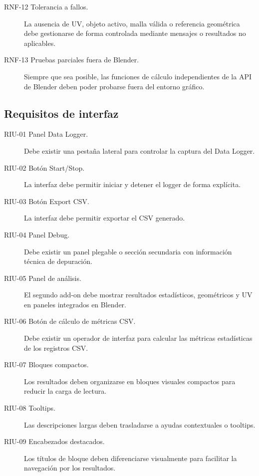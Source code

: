 \begin{description}
    \item[RNF-12 Tolerancia a fallos.] La ausencia de UV, objeto activo, malla válida o referencia geométrica debe gestionarse de forma controlada mediante mensajes o resultados no aplicables.

    \item[RNF-13 Pruebas parciales fuera de Blender.] Siempre que sea posible, las funciones de cálculo independientes de la API de Blender deben poder probarse fuera del entorno gráfico.
\end{description}

\subsection{Requisitos de interfaz}

\begin{description}
    \item[RIU-01 Panel Data Logger.] Debe existir una pestaña lateral para controlar la captura del Data Logger.

    \item[RIU-02 Botón Start/Stop.] La interfaz debe permitir iniciar y detener el logger de forma explícita.

    \item[RIU-03 Botón Export CSV.] La interfaz debe permitir exportar el CSV generado.

    \item[RIU-04 Panel Debug.] Debe existir un panel plegable o sección secundaria con información técnica de depuración.

    \item[RIU-05 Panel de análisis.] El segundo add-on debe mostrar resultados estadísticos, geométricos y UV en paneles integrados en Blender.

    \item[RIU-06 Botón de cálculo de métricas CSV.] Debe existir un operador de interfaz para calcular las métricas estadísticas de los registros CSV.

    \item[RIU-07 Bloques compactos.] Los resultados deben organizarse en bloques visuales compactos para reducir la carga de lectura.

    \item[RIU-08 Tooltips.] Las descripciones largas deben trasladarse a ayudas contextuales o tooltips.

    \item[RIU-09 Encabezados destacados.] Los títulos de bloque deben diferenciarse visualmente para facilitar la navegación por los resultados.


\end{description}
